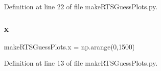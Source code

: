 Definition at line 22 of file make\+R\+T\+S\+Guess\+Plots.\+py.

\mbox{\label{namespacemake_r_t_s_guess_plots_a3694a267eb0fa7fb7a11227b6edacc7e}} 
\subsubsection{x}
{\footnotesize\ttfamily make\+R\+T\+S\+Guess\+Plots.\+x = np.\+arange(0,1500)}



Definition at line 13 of file make\+R\+T\+S\+Guess\+Plots.\+py.

